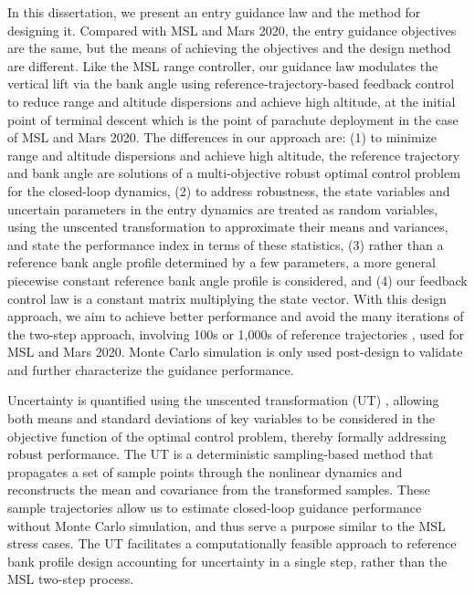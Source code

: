 In this dissertation, we present an entry guidance law and the method for designing it. Compared with MSL and Mars 2020, the entry guidance objectives are the same, but the means of achieving the objectives and the design method are different. Like the MSL range controller, our guidance law modulates the vertical lift via the bank angle using reference-trajectory-based feedback control to reduce range and altitude dispersions and achieve high altitude, at the initial point of terminal descent which is the point of parachute deployment in the case of MSL and Mars 2020.  The differences in our approach are: (1) to minimize range and altitude dispersions and achieve high altitude, the reference trajectory and bank angle are solutions of a multi-objective robust optimal control problem for the closed-loop dynamics, (2) to address robustness, the state variables and uncertain parameters in the entry dynamics are treated as random variables, using the unscented transformation to approximate their means and variances, and state the performance index in terms of these statistics, (3) rather than a reference bank angle profile determined by a few parameters, a more general piecewise constant reference bank angle profile is considered, and (4) our feedback control law is a constant matrix multiplying the state vector. 
With this design approach, we aim to achieve better performance and avoid the many iterations of the two-step approach, involving 100s or 1,000s of reference trajectories \cite{MSL_EDL2}, used for MSL and Mars 2020. Monte Carlo simulation is only used post-design to validate and further characterize the guidance performance.

Uncertainty is quantified using the unscented transformation (UT) \cite{UT1997}, allowing both means and standard deviations of key variables to be considered in the objective function of the optimal control problem, thereby formally addressing robust performance. The UT is a deterministic sampling-based method that propagates a set of sample points through the nonlinear dynamics and reconstructs the mean and covariance from the transformed samples. These sample trajectories allow us to estimate closed-loop guidance performance without Monte Carlo simulation, and thus serve a purpose similar to the MSL stress cases. The UT facilitates a computationally feasible approach to reference bank profile design accounting for uncertainty in a single step, rather than the MSL two-step process.


